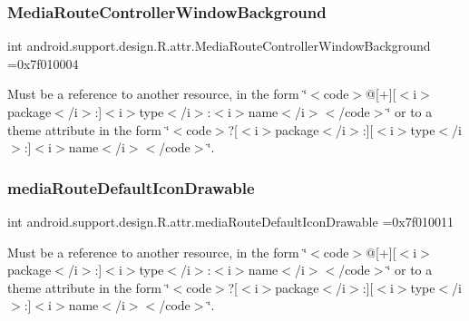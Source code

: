 \subsubsection{\texorpdfstring{Media\+Route\+Controller\+Window\+Background}{MediaRouteControllerWindowBackground}}
{\footnotesize\ttfamily int android.\+support.\+design.\+R.\+attr.\+Media\+Route\+Controller\+Window\+Background =0x7f010004\hspace{0.3cm}{\ttfamily [static]}}

Must be a reference to another resource, in the form \char`\"{}$<$code$>$@\mbox{[}+\mbox{]}\mbox{[}$<$i$>$package$<$/i$>$\+:\mbox{]}$<$i$>$type$<$/i$>$\+:$<$i$>$name$<$/i$>$$<$/code$>$\char`\"{} or to a theme attribute in the form \char`\"{}$<$code$>$?\mbox{[}$<$i$>$package$<$/i$>$\+:\mbox{]}\mbox{[}$<$i$>$type$<$/i$>$\+:\mbox{]}$<$i$>$name$<$/i$>$$<$/code$>$\char`\"{}. \mbox{\label{classandroid_1_1support_1_1design_1_1R_1_1attr_abaad978aa70c86cdf43436543749e283}} 
\subsubsection{\texorpdfstring{media\+Route\+Default\+Icon\+Drawable}{mediaRouteDefaultIconDrawable}}
{\footnotesize\ttfamily int android.\+support.\+design.\+R.\+attr.\+media\+Route\+Default\+Icon\+Drawable =0x7f010011\hspace{0.3cm}{\ttfamily [static]}}

Must be a reference to another resource, in the form \char`\"{}$<$code$>$@\mbox{[}+\mbox{]}\mbox{[}$<$i$>$package$<$/i$>$\+:\mbox{]}$<$i$>$type$<$/i$>$\+:$<$i$>$name$<$/i$>$$<$/code$>$\char`\"{} or to a theme attribute in the form \char`\"{}$<$code$>$?\mbox{[}$<$i$>$package$<$/i$>$\+:\mbox{]}\mbox{[}$<$i$>$type$<$/i$>$\+:\mbox{]}$<$i$>$name$<$/i$>$$<$/code$>$\char`\"{}. \mbox{\label{classandroid_1_1support_1_1design_1_1R_1_1attr_a73d4cfc0032f404630269bbe60787c97}} 
